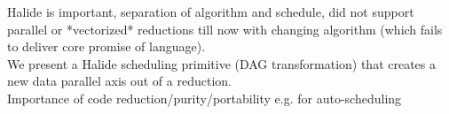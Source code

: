 Halide is important, separation of algorithm and schedule, did not support parallel or *vectorized* reductions till now with changing algorithm (which fails to deliver core promise of language).\\

We present a Halide scheduling primitive (DAG transformation) that creates a new data parallel axis out of a reduction.\\

Importance of code reduction/purity/portability e.g. for auto-scheduling